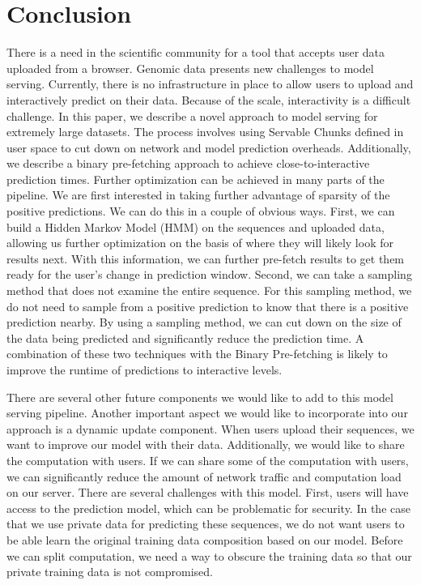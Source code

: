 \documentclass{sig-alternate-05-2015}
\begin{document}
\section{Conclusion}
There is a need in the scientific community for a tool that accepts user data uploaded from a browser. Genomic data presents new challenges to model serving. Currently, there is no infrastructure in place to allow users to upload and interactively predict on their data. Because of the scale, interactivity is a difficult challenge. In this paper, we describe a novel approach to model serving for extremely large datasets. The process involves using Servable Chunks defined in user space to cut down on network and model prediction overheads. Additionally, we describe a binary pre-fetching approach to achieve close-to-interactive prediction times. Further optimization can be achieved in many parts of the pipeline. We are first interested in taking further advantage of sparsity of the positive predictions. We can do this in a couple of obvious ways. First, we can build a Hidden Markov Model (HMM) on the sequences and uploaded data, allowing us further optimization on the basis of where they will likely look for results next. With this information, we can further pre-fetch results to get them ready for the user's change in prediction window. Second, we can take a sampling method that does not examine the entire sequence. For this sampling method, we do not need to sample from a positive prediction to know that there is a positive prediction nearby. By using a sampling method, we can cut down on the size of the data being predicted and significantly reduce the prediction time. A combination of these two techniques with the Binary Pre-fetching is likely to improve the runtime of predictions to interactive levels.

There are several other future components we would like to add to this model serving pipeline. Another important aspect we would like to incorporate into our approach is a dynamic update component. When users upload their sequences, we want to improve our model with their data. Additionally, we would like to share the computation with users. If we can share some of the computation with users, we can significantly reduce the amount of network traffic and computation load on our server. There are several challenges with this model. First, users will have access to the prediction model, which can be problematic for security. In the case that we use private data for predicting these sequences, we do not want users to be able learn the original training data composition based on our model. Before we can split computation, we need a way to obscure the training data so that our private training data is not compromised.
\end{document}
